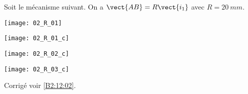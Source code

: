 \normaltrue
\correctiontrue


\setcounter{question}{0}
\ifcorrection
\else
{}
\fi

\ifprof
\else
Soit le mécanisme suivant. On a $\vect{AB}=R\vect{i_1}$ avec $R=\SI{20}{mm}$. 
\begin{center}
\texttt{[image: 02\_R\_01]}
\end{center}
\fi

\ifprof
\begin{multicols}{3}
\else
\fi
{}
\ifprof
\begin{center}
\texttt{[image: 02\_R\_01\_c]}
\end{center}
\vfill\null
\columnbreak
\else
\fi

\ifprof
\begin{center}
\texttt{[image: 02\_R\_02\_c]}
\end{center}
\vfill\null
\columnbreak
\else
\fi

\ifprof
\begin{center}
\texttt{[image: 02\_R\_03\_c]}
\end{center}
\else
\fi



\ifprof
\end{multicols}
\else
\fi

\ifprof
\else
\begin{flushright}
\footnotesize{Corrigé  voir \ref{B2:12:02}.}
\end{flushright}%
\fi